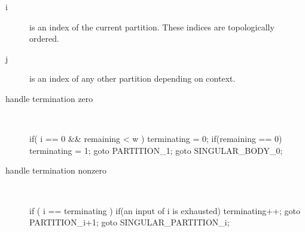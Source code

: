 \begin{description}
  \item[i] is an index of the current partition. These indices are topologically ordered.
  \item[j] is an index of any other partition depending on context. 
  \item[handle termination zero] \ \ \ 
\begin{samepage}
\begin{code}
if( i == 0 && remaining < w )                            
{                                                          
  terminating = 0;                                     
  if(remaining == 0)                                   
  {                                                    
    terminating = 1;                                   
    goto PARTITION_1;                            
  }                                                    
  goto SINGULAR_BODY_0;
}                                                      
\end{code}
\end{samepage}
\item[handle termination nonzero] \ \ \ 
\begin{samepage}
\begin{code}
if ( i == terminating )                                   
{                                                          
  if(an input of i is exhausted)                  
  {                                                        
    terminating++;                                         
    goto PARTITION_i+1;                                
  }                                                        
  goto SINGULAR_PARTITION_i;
}   
\end{code}
\end{samepage}
\end{description}
\myendalg

